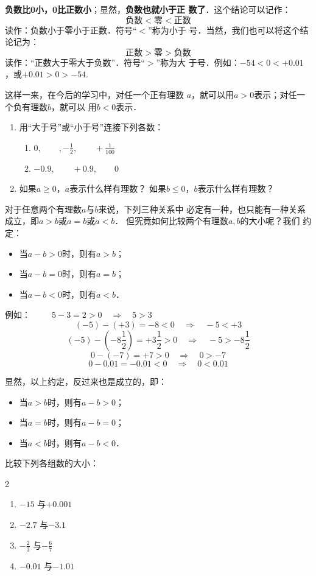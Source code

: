\textbf{负数比0小，0比正数小}；显然，\textbf{负数也就小于正
数了}．这个结论可以记作：
\[\text{负数}<\text{零}<\text{正数}\]
读作：负数小于零小于正数．符号“$<$”称为小于
号．当然，我们也可以将这个结论记为：
\[\text{正数}>\text{零}>\text{负数}\]
读作：“正数大于零大于负数”．符号“$>$”称为大
于号．例如：$-54<0<+0.01$，或$+0.01>0> -54$.

这样一来，在今后的学习中，对任一个正有理数
$a$，就可以用$a>0$表示；对任一个负有理数$b$，就可以
用$b<0$表示．

\begin{ex}
\begin{enumerate}
    \item 用“大于号”或“小于号”连接下列各数：
\begin{enumerate}
    \item $0,\qquad ,-\frac{1}{2},\qquad +\frac{1}{100}$
    \item $-0.9,\qquad +0.9,\qquad 0$
\end{enumerate}
\item 如果$a\ge 0$，$a$表示什么样有理数？
如果$b\le 0$，$b$表示什么样有理数？
\end{enumerate}
 \end{ex}   

    对于任意两个有理数$a$与$b$来说，下列三种关系中
必定有一种，也只能有一种关系成立，即$a>b$或$a =b$或$a<b$．
    但究竟如何比较两个有理数$a,  b$的大小呢？我们
约定：
\begin{itemize}
    \item 当$a-b>0$时，则有$a > b$；
    \item 当$a-b=0$时，则有$a=b$；
    \item 当$a-b<0$时，则有$a < b$．
\end{itemize}

例如：\ \ \ \ \ \qquad$5-3=2>0 \quad \Rightarrow\quad 5>3$
\[(-5)-(+3)=-8<0 \quad \Rightarrow\quad -5<+3\]
\[(-5)-\left(-8\frac{1}{2}\right)=+3\frac{1}{2}>0 \quad \Rightarrow\quad -5>-8\frac{1}{2}\]
\[0-(-7)=+7>0 \quad \Rightarrow\quad 0>-7\]
\[0-0.01=-0.01<0 \quad \Rightarrow\quad 0<0.01\]

显然，以上约定，反过来也是成立的，即：
\begin{itemize}
    \item 当$a>b$时，则有$a-b>0$；
    \item     当$a =b$时，则有$a-b=0$；
    \item     当$a<b$时，则有$a-b<0$．
\end{itemize}

\begin{example}
    比较下列各组数的大小：
   \begin{multicols}{2}
\begin{enumerate}
    \item $-15$ 与$+0.001$
    \item $-2.7$ 与$-3.1$
    \item $-\frac{2}{3}$ 与$-\frac{6}{7}$
    \item $-0.01$ 与$-1.01$
\end{enumerate}
   \end{multicols}
\end{example}

